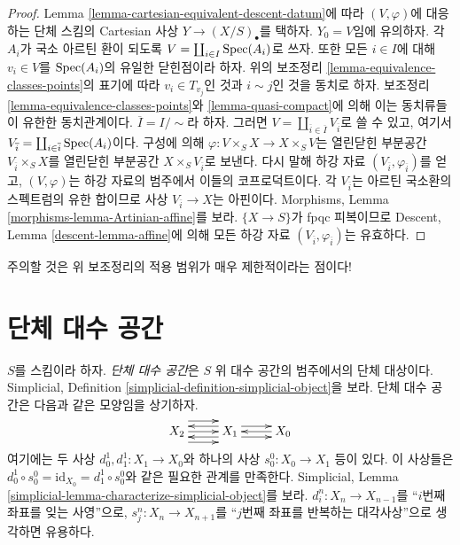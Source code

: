 \begin{proof}
Lemma \ref{lemma-cartesian-equivalent-descent-datum}에 따라
$(V, \varphi)$에 대응하는 단체 스킴의 Cartesian 사상
$Y \to (X/S)_\bullet$를 택하자.
$Y_0 = V$임에 유의하자.
각 $A_i$가 국소 아르틴 환이 되도록
$V = \coprod_{i \in I} \mathop{\mathrm{Spec}}(A_i)$로 쓰자.
또한 모든 $i \in I$에 대해 $v_i \in V$를
$\mathop{\mathrm{Spec}}(A_i)$의 유일한 닫힌점이라 하자.
위의 보조정리 \ref{lemma-equivalence-classes-points}의 표기에 따라
$v_i \in T_{v_j}$인 것과
$i \sim j$인 것을 동치로 하자.
보조정리 \ref{lemma-equivalence-classes-points}와
\ref{lemma-quasi-compact}에 의해 이는 동치류들이 유한한
동치관계이다. $\overline{I} = I/\sim$라 하자. 그러면
$V = \coprod_{\overline{i} \in \overline{I}} V_{\overline{i}}$로 쓸 수 있고,
여기서
$V_{\overline{i}} = \coprod_{i \in \overline{i}} \mathop{\mathrm{Spec}}(A_i)$이다.
구성에 의해
$\varphi : V \times_S X \to X \times_S V$는
열린닫힌 부분공간 $V_{\overline{i}} \times_S X$를
열린닫힌 부분공간 $X \times_S V_{\overline{i}}$로 보낸다.
다시 말해 하강 자료
$(V_{\overline{i}}, \varphi_{\overline{i}})$를 얻고,
$(V, \varphi)$는 하강 자료의 범주에서 이들의 코프로덕트이다.
각 $V_{\overline{i}}$는 아르틴 국소환의 스펙트럼의 유한 합이므로
사상 $V_{\overline{i}} \to X$는 아핀이다.
Morphisms, Lemma \ref{morphisms-lemma-Artinian-affine}를 보라.
$\{X \to S\}$가 fpqc 피복이므로 Descent, Lemma
\ref{descent-lemma-affine}에 의해 모든 하강 자료
$(V_{\overline{i}}, \varphi_{\overline{i}})$는 유효하다.
\end{proof}

\noindent
주의할 것은 위 보조정리의 적용 범위가 매우 제한적이라는 점이다!
\section{단체 대수 공간}
\label{section-simplicial-algebraic-spaces}

\noindent
$S$를 스킴이라 하자. {\it 단체 대수 공간}은 $S$ 위 대수 공간의
범주에서의 단체 대상이다. Simplicial, Definition
\ref{simplicial-definition-simplicial-object}을 보라.
단체 대수 공간은 다음과 같은 모양임을 상기하자.
$$
\xymatrix{
X_2
\ar@<2ex>[r]
\ar@<0ex>[r]
\ar@<-2ex>[r]
&
X_1
\ar@<1ex>[r]
\ar@<-1ex>[r]
\ar@<1ex>[l]
\ar@<-1ex>[l]
&
X_0
\ar@<0ex>[l]
}
$$
여기에는 두 사상 $d^1_0, d^1_1 : X_1 \to X_0$와
하나의 사상 $s^0_0 : X_0 \to X_1$ 등이 있다.
이 사상들은
$d^1_0 \circ s^0_0 = \text{id}_{X_0} = d^1_1 \circ s^0_0$와 같은
필요한 관계를 만족한다. Simplicial, Lemma
\ref{simplicial-lemma-characterize-simplicial-object}를 보라.
$d^n_i : X_n \to X_{n - 1}$를 “$i$번째 좌표를 잊는 사영”으로,
$s^n_j : X_n \to X_{n + 1}$를 “$j$번째 좌표를 반복하는
대각사상”으로 생각하면 유용하다.

